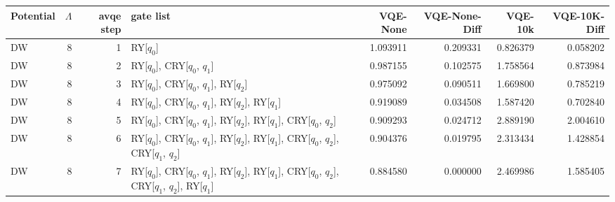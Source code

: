 \begin{tabular}{lrrlrrrr}
\toprule
Potential & $\Lambda$ & avqe step & gate list & VQE-None & VQE-None-Diff & VQE-10k & VQE-10K-Diff \\
\midrule
DW & 8 & 1 & RY[$q_0$] & 1.093911 & 0.209331 & 0.826379 & 0.058202 \\
DW & 8 & 2 & RY[$q_0$], CRY[$q_0$, $q_1$] & 0.987155 & 0.102575 & 1.758564 & 0.873984 \\
DW & 8 & 3 & RY[$q_0$], CRY[$q_0$, $q_1$], RY[$q_2$] & 0.975092 & 0.090511 & 1.669800 & 0.785219 \\
DW & 8 & 4 & RY[$q_0$], CRY[$q_0$, $q_1$], RY[$q_2$], RY[$q_1$] & 0.919089 & 0.034508 & 1.587420 & 0.702840 \\
DW & 8 & 5 & RY[$q_0$], CRY[$q_0$, $q_1$], RY[$q_2$], RY[$q_1$], CRY[$q_0$, $q_2$] & 0.909293 & 0.024712 & 2.889190 & 2.004610 \\
DW & 8 & 6 & RY[$q_0$], CRY[$q_0$, $q_1$], RY[$q_2$], RY[$q_1$], CRY[$q_0$, $q_2$], CRY[$q_1$, $q_2$] & 0.904376 & 0.019795 & 2.313434 & 1.428854 \\
DW & 8 & 7 & RY[$q_0$], CRY[$q_0$, $q_1$], RY[$q_2$], RY[$q_1$], CRY[$q_0$, $q_2$], CRY[$q_1$, $q_2$], RY[$q_1$] & 0.884580 & 0.000000 & 2.469986 & 1.585405 \\
\bottomrule
\end{tabular}

